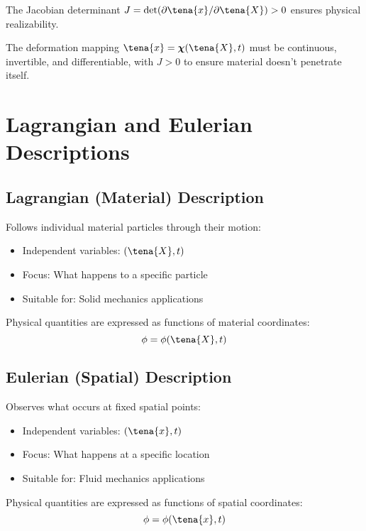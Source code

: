 The Jacobian determinant $J = \det(\partial \tena{x}/\partial \tena{X}) > 0$ ensures physical realizability.

\begin{keypoint}
The deformation mapping $\tena{x} = \boldsymbol{\chi}(\tena{X}, t)$ must be continuous, invertible, and differentiable, with $J > 0$ to ensure material doesn't penetrate itself.
\end{keypoint}

\section{Lagrangian and Eulerian Descriptions}

\subsection{Lagrangian (Material) Description}

Follows individual material particles through their motion:
\begin{itemize}
\item Independent variables: $(\tena{X}, t)$
\item Focus: What happens to a specific particle
\item Suitable for: Solid mechanics applications
\end{itemize}

Physical quantities are expressed as functions of material coordinates:
\begin{equation}
\phi = \phi(\tena{X}, t)
\end{equation}

\subsection{Eulerian (Spatial) Description}

Observes what occurs at fixed spatial points:
\begin{itemize}
\item Independent variables: $(\tena{x}, t)$
\item Focus: What happens at a specific location
\item Suitable for: Fluid mechanics applications
\end{itemize}

Physical quantities are expressed as functions of spatial coordinates:
\begin{equation}
\phi = \phi(\tena{x}, t)
\end{equation}

